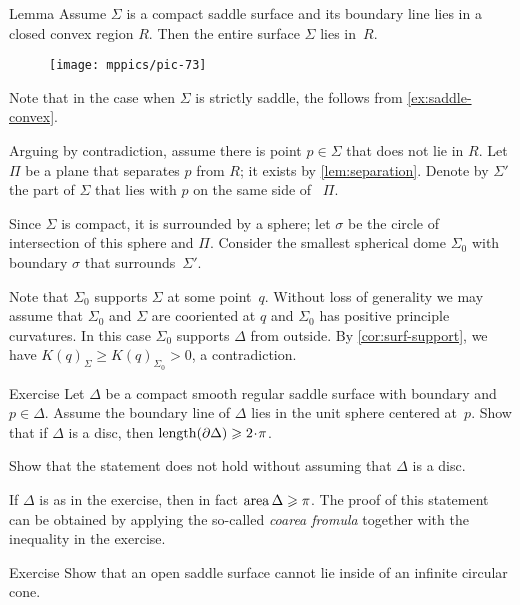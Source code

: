 \begin{thm}{Lemma}\label{lem:convex-saddle}
Assume $\Sigma$ is a compact saddle surface and its boundary line lies in a closed convex  region $R$.
Then the entire surface $\Sigma$ lies in~$R$.
\end{thm}

\begin{wrapfigure}{O}{45 mm}
\vskip-5mm
\centering
\texttt{[image: mppics/pic-73]}
\vskip0mm
\end{wrapfigure}


Note that in the case when $\Sigma$ is strictly saddle, the follows from \ref{ex:saddle-convex}.


Arguing by contradiction,
assume there is point $p\in \Sigma$ that does not lie in $R$.
Let $\Pi$ be a plane that separates $p$ from $R$; it exists by \ref{lem:separation}.
Denote by $\Sigma'$ the part of $\Sigma$ that lies with $p$ on the same side of ~$\Pi$.

Since $\Sigma$ is compact, it is surrounded by a sphere;
let $\sigma$ be the circle of intersection of this sphere and $\Pi$.
Consider the smallest spherical dome $\Sigma_0$ with boundary $\sigma$ that surrounds~$\Sigma'$.

Note that $\Sigma_0$ supports $\Sigma$ at some point~$q$.
Without loss of generality we may assume that $\Sigma_0$ and $\Sigma$ are cooriented at $q$ and $\Sigma_0$ has positive principle curvatures.
In this case $\Sigma_0$ supports $\Delta$ from outside.
By \ref{cor:surf-support}, we have $K(q)_\Sigma\ge K(q)_{\Sigma_0}>0$, a contradiction.
\qeds

\begin{thm}{Exercise}\label{ex:length-of-bry}
Let $\Delta$ be a compact smooth regular saddle surface with boundary and $p\in \Delta$.
Assume the boundary line of $\Delta$ lies in the unit sphere centered at~$p$.
Show that if $\Delta$ is a disc, then $\length (\partial \Delta)\ge 2\cdot\pi$.

Show that the statement does not hold without assuming that $\Delta$ is a disc.
\end{thm}

If $\Delta$ is as in the exercise, then in fact $\mathop{\rm area}\nolimits \Delta\geqslant \pi$.
The proof of this statement can be obtained by applying the so-called \emph{coarea fromula} together with the inequality in the exercise. 

\begin{thm}{Exercise}\label{ex:circular-cone-saddle}
Show that an open saddle surface
cannot lie inside of an infinite circular cone. 
\end{thm}

